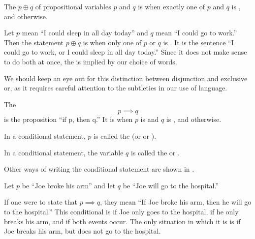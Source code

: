 \begin{defn}[exclusive or]
  The 
  $p \oplus q$
  of propositional variables
  $p$ and $q$ is \ltrue{} when exactly one of $p$ and $q$ is \ltrue{},
  and \lfalse{} otherwise.
\end{defn}

\begin{ex}
  Let $p$ mean ``I could sleep in all day today''
  and $q$ mean ``I could go to work.''
  Then the statement $p \oplus q$ is \ltrue{} when only one of $p$ or $q$ is \ltrue{}.
  It is the sentence ``I could go to work, or I could sleep in all day today.''
  Since it does not make sense to do both at once,
  the  is implied by our choice of words.
  \begin{remark}
    We should keep an eye out for this distinction between disjunction and
    exclusive or, as it requires careful attention to the subtleties in our use of
    language.
  \end{remark}
  \label{ex:prop:xordefn}
\end{ex}

\begin{defn}
  The 
  \begin{equation}
    p \implies q
    \label{eq:propositional:conditional}
  \end{equation}
  is the proposition ``if p, then q.''
  It is \lfalse{} when $p$ is \ltrue{} and $q$ is \lfalse{}, and \ltrue{} otherwise.
  \label{def:conditional}
\end{defn}

\begin{defn}[hypothesis]
  In a conditional statement, $p$ is called the 
  (or  or ).
\end{defn}

\begin{defn}[conclusion]
  In a conditional statement, the variable $q$ is called the 
  or .

  Other ways of writing the conditional statement are shown in .
\end{defn}

\begin{ex}
  Let $p$ be ``Joe broke his arm''
  and let $q$ be ``Joe will go to the hospital.''

  If one were to state that $p \implies q$, they mean
  ``If Joe broke his arm, then he will go to the hospital.''
  This conditional is \ltrue{} if Joe only goes to the hospital,
  if he only breaks his arm, and if both events occur.
  The only situation in which it is \lfalse{} is if Joe breaks his arm,
  but does not go to the hospital.
\end{ex}

